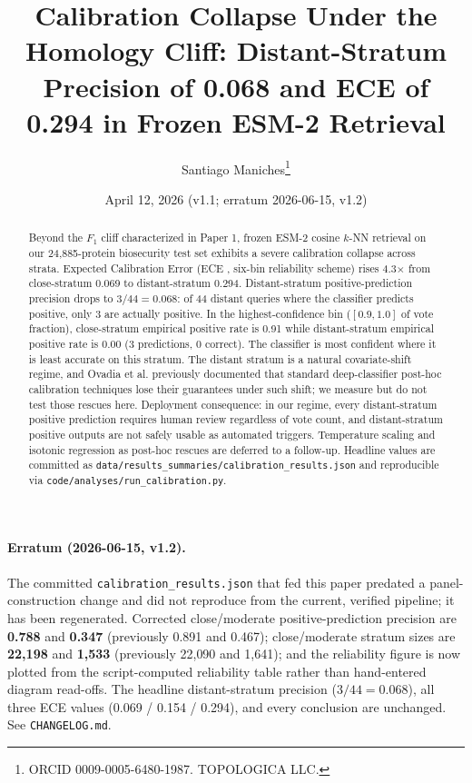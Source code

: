 \documentclass[11pt]{article}
\title{Calibration Collapse Under the Homology Cliff: Distant-Stratum Precision of 0.068 and ECE of 0.294 in Frozen ESM-2 Retrieval}
\author{Santiago Maniches\thanks{ORCID 0009-0005-6480-1987. TOPOLOGICA LLC.}}
\date{April 12, 2026 (v1.1; erratum 2026-06-15, v1.2)}
\begin{document}
\maketitle
\begin{abstract}
Beyond the $F_1$ cliff characterized in Paper 1, frozen ESM-2 \cite{lin2023evolutionary} cosine $k$-NN retrieval on our 24{,}885-protein biosecurity test set exhibits a severe calibration collapse across strata. Expected Calibration Error (ECE \cite{guo2017calibration}, six-bin reliability scheme) rises 4.3$\times$ from close-stratum 0.069 to distant-stratum 0.294. Distant-stratum positive-prediction precision drops to $3/44 = 0.068$: of 44 distant queries where the classifier predicts positive, only 3 are actually positive. In the highest-confidence bin ($[0.9, 1.0]$ of vote fraction), close-stratum empirical positive rate is 0.91 while distant-stratum empirical positive rate is 0.00 (3 predictions, 0 correct). The classifier is most confident where it is least accurate on this stratum. The distant stratum is a natural covariate-shift regime, and Ovadia et al. \cite{ovadia2019shift} previously documented that standard deep-classifier post-hoc calibration techniques lose their guarantees under such shift; we measure but do not test those rescues here. Deployment consequence: in our regime, every distant-stratum positive prediction requires human review regardless of vote count, and distant-stratum positive outputs are not safely usable as automated triggers. Temperature scaling and isotonic regression \cite{guo2017calibration} as post-hoc rescues are deferred to a follow-up. Headline values are committed as \texttt{data/results\_summaries/calibration\_results.json} and reproducible via \texttt{code/analyses/run\_calibration.py}.
\end{abstract}

\paragraph{Erratum (2026-06-15, v1.2).} The committed \texttt{calibration\_results.json} that fed this paper predated a panel-construction change and did not reproduce from the current, verified pipeline; it has been regenerated. Corrected close/moderate positive-prediction precision are \textbf{0.788} and \textbf{0.347} (previously 0.891 and 0.467); close/moderate stratum sizes are \textbf{22{,}198} and \textbf{1{,}533} (previously 22{,}090 and 1{,}641); and the reliability figure is now plotted from the script-computed reliability table rather than hand-entered diagram read-offs. The headline distant-stratum precision ($3/44 = 0.068$), all three ECE values (0.069 / 0.154 / 0.294), and every conclusion are unchanged. See \texttt{CHANGELOG.md}.
\end{document}
